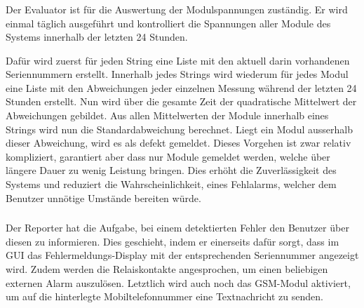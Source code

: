 \subsubsection{}
\label{subsubsec:software:master:implementation:evaluator}

Der  Evaluator ist  f\"ur die  Auswertung der  Modulspannungen zust\"andig. Er
wird  einmal  t\"aglich ausgef\"uhrt  und  kontrolliert  die Spannungen  aller
Module des Systems innerhalb der letzten 24 Stunden.

Daf\"ur  wird zuerst  f\"ur  jeden String  eine Liste  mit  den aktuell  darin
vorhandenen  Seriennummern  erstellt. Innerhalb  jedes Strings  wird  wiederum
f\"ur  jedes Modul  eine Liste  mit den  Abweichungen jeder  einzelnen Messung
w\"ahrend der  letzten 24 Stunden  erstellt. Nun wird \"uber die  gesamte Zeit
der quadratische Mittelwert der  Abweichungen gebildet. Aus allen Mittelwerten
der   Module  innerhalb   eines  Strings   wird  nun   die  Standardabweichung
berechnet. Liegt ein  Modul ausserhalb dieser  Abweichung, wird es  als defekt
gemeldet. Dieses Vorgehen  ist zwar relativ kompliziert,  garantiert aber dass
nur Module  gemeldet werden, welche  \"uber l\"angere Dauer zu  wenig Leistung
bringen. Dies  erh\"oht  die  Zuverl\"assigkeit   des  Systems  und  reduziert
die  Wahrscheinlichkeit, eines  Fehlalarms,  welcher  dem Benutzer  unn\"otige
Umst\"ande bereiten w\"urde.


\subsubsection{}
\label{subsubsec:software:master:implementation:reporter}

Der  Reporter hat  die Aufgabe,  bei  einem detektierten  Fehler den  Benutzer
\"uber  diesen zu  informieren. Dies  geschieht, indem  er einerseits  daf\"ur
sorgt,  dass   im  GUI  das  Fehlermeldungs-Display   mit  der  entsprechenden
Seriennummer  angezeigt wird. Zudem  werden  die Relaiskontakte  angesprochen,
um  einen beliebigen  externen  Alarm auszul\"osen. Letztlich  wird auch  noch
das  GSM-Modul  aktiviert,  um  auf die  hinterlegte  Mobiltelefonnummer  eine
Textnachricht zu senden.

